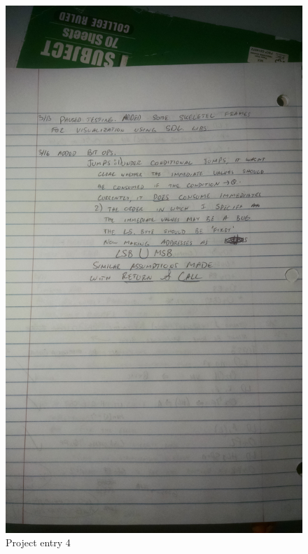 \documentclass{article}
\begin{document}
     \begin{figure}[h]
        \centering
        \includegraphics[width=12cm, keepaspectratio]{entry_4}
        \caption{Project entry 4}
    \end{figure}   
    
\end{document}

